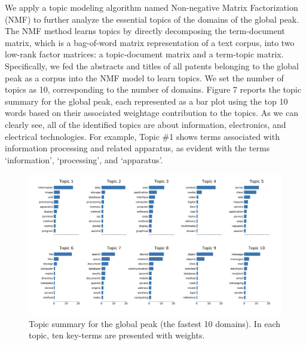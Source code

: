 \documentclass{article}
\begin{document}
We apply a topic modeling algorithm named Non-negative Matrix Factorization (NMF) \cite{lee1999learning} to further analyze the essential topics of the domains of the global peak. The NMF method learns topics by directly decomposing the term-document matrix, which is a bag-of-word matrix representation of a text corpus, into two low-rank factor matrices: a topic-document matrix and a term-topic matrix. Specifically, we fed the abstracts and titles of all patents belonging to the global peak as a corpus into the NMF model to learn topics. We set the number of topics as 10, corresponding to the number of domains. Figure 7 reports the topic summary for the global peak, each represented as a bar plot using the top 10 words based on their associated weightage contribution to the topics. As we can clearly see, all of the identified topics are about information, electronics, and electrical technologies. For example, Topic \#1 shows terms associated with information processing and related apparatus, as evident with the terms ‘information’, ‘processing’, and ‘apparatus’.

\begin{figure}[H]
	\centering
	\includegraphics[width=15cm]{FIG7.png}
	\caption{Topic summary for the global peak (the fastest 10 domains). In each topic, ten key-terms are presented with weights.}
	\label{fig:fig7}
\end{figure}
\end{document}
